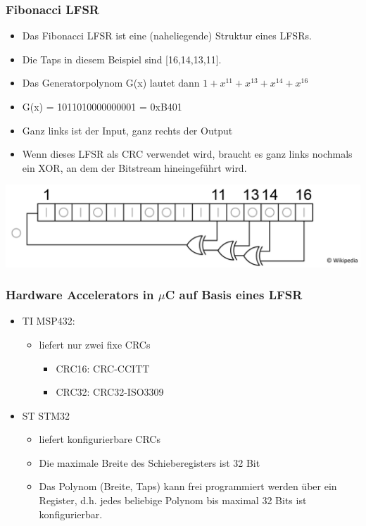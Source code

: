\subsubsection{Fibonacci LFSR}
\begin{itemize}
	\item Das Fibonacci LFSR ist eine (naheliegende) Struktur eines LFSRs.
	\item Die Taps in diesem Beispiel sind [16,14,13,11].
	\item Das Generatorpolynom G(x) lautet dann $1 + x^{11} + x^{13} + x^{14} + x^{16}$
	\item G(x) = 1011010000000001 = 0xB401
	\item Ganz links ist der Input, ganz rechts der Output
	\item Wenn dieses LFSR als CRC verwendet wird, braucht es ganz links nochmals ein XOR, an dem der Bitstream hineingeführt wird.
\end{itemize}
\includegraphics[width=0.6\linewidth]{images/CRC/lfsr}

\subsubsection{Hardware Accelerators in $\mu$C auf Basis eines LFSR}
\begin{itemize}
	\item TI MSP432:
	\begin{itemize}
		\item liefert nur zwei fixe CRCs
		\begin{itemize}
			\item CRC16: CRC-CCITT
			\item CRC32: CRC32-ISO3309
		\end{itemize}
	\end{itemize}
	\item ST STM32
	\begin{itemize}
		\item liefert konfigurierbare CRCs
		\item Die maximale Breite des Schieberegisters ist 32 Bit
		\item Das Polynom (Breite, Taps) kann frei programmiert werden über ein Register, d.h. jedes beliebige Polynom bis maximal 32 Bits ist konfigurierbar.
	\end{itemize}
\end{itemize}
